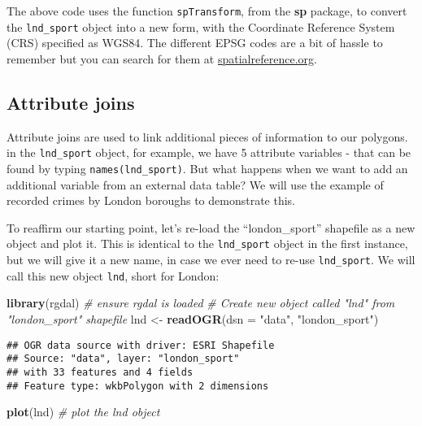 \documentclass[]{article}
\newenvironment{Shaded}{}{}
\newcommand{\KeywordTok}[1]{\textcolor[rgb]{0.00,0.44,0.13}{\textbf{{#1}}}}
\newcommand{\DataTypeTok}[1]{\textcolor[rgb]{0.56,0.13,0.00}{{#1}}}
\newcommand{\StringTok}[1]{\textcolor[rgb]{0.25,0.44,0.63}{{#1}}}
\newcommand{\CommentTok}[1]{\textcolor[rgb]{0.38,0.63,0.69}{\textit{{#1}}}}
\newcommand{\NormalTok}[1]{{#1}}
\begin{document}
The above code uses the function \texttt{spTransform}, from the
\textbf{sp} package, to convert the \texttt{lnd\_sport} object into a
new form, with the Coordinate Reference System (CRS) specified as WGS84.
The different EPSG codes are a bit of hassle to remember but you can
search for them at
\href{http://spatialreference.org/}{spatialreference.org}.

\subsection{Attribute joins}\label{attribute-joins}

Attribute joins are used to link additional pieces of information to our
polygons. in the \texttt{lnd\_sport} object, for example, we have 5
attribute variables - that can be found by typing
\texttt{names(lnd\_sport)}. But what happens when we want to add an
additional variable from an external data table? We will use the example
of recorded crimes by London boroughs to demonstrate this.

To reaffirm our starting point, let's re-load the ``london\_sport''
shapefile as a new object and plot it. This is identical to the
\texttt{lnd\_sport} object in the first instance, but we will give it a
new name, in case we ever need to re-use \texttt{lnd\_sport}. We will
call this new object \texttt{lnd}, short for London:

\begin{Shaded}
\begin{Highlighting}[]
\KeywordTok{library}\NormalTok{(rgdal) }\CommentTok{# ensure rgdal is loaded}
\CommentTok{# Create new object called "lnd" from "london_sport" shapefile}
\NormalTok{lnd <-}\StringTok{ }\KeywordTok{readOGR}\NormalTok{(}\DataTypeTok{dsn =} \StringTok{"data"}\NormalTok{, }\StringTok{"london_sport"}\NormalTok{)}
\end{Highlighting}
\end{Shaded}

\begin{verbatim}
## OGR data source with driver: ESRI Shapefile 
## Source: "data", layer: "london_sport"
## with 33 features and 4 fields
## Feature type: wkbPolygon with 2 dimensions
\end{verbatim}

\begin{Shaded}
\begin{Highlighting}[]
\KeywordTok{plot}\NormalTok{(lnd) }\CommentTok{# plot the lnd object}
\end{Highlighting}
\end{Shaded}
\end{document}
